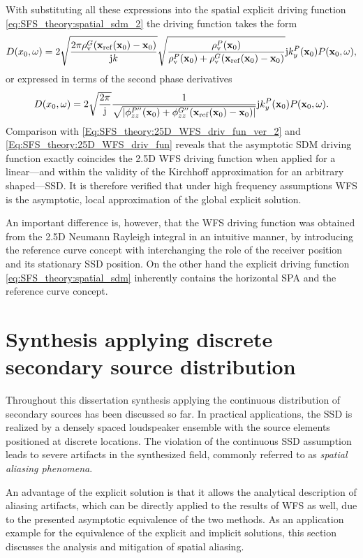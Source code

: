 With substituting all these expressions into the spatial explicit driving function \eqref{eq:SFS_theory:spatial_sdm_2} the driving function takes the form
\begin{equation}
D(x_0,\omega) =
2\sqrt{\frac{2\pi  \rho_\mathrm{v}^G(\mathbf{x}_{\mathrm{ref}}(\mathbf{x}_0)-\mathbf{x}_0)}{\mathrm{j} k}} 
\sqrt{\frac{\rho_\mathrm{v}^P(\mathbf{x}_0) }{\rho_\mathrm{v}^P(\mathbf{x}_0) + \rho_\mathrm{v}^G(\mathbf{x}_{\mathrm{ref}}(\mathbf{x}_0)-\mathbf{x}_0)}}
\mathrm{j} k_y^{P}(\mathbf{x}_0)
P(\mathbf{x}_0,\omega),
\end{equation}
or expressed in terms of the second phase derivatives 
\begin{equation}
D(x_0,\omega) =
2\sqrt{\frac{2\pi }{\mathrm{j} }} 
\frac{ 1 }{\sqrt{|\phi^{P''}_{zz}(\mathbf{x}_0) + \phi^{G''}_{zz}(\mathbf{x}_{\mathrm{ref}}(\mathbf{x}_0)-\mathbf{x}_0)|}}
\mathrm{j} k_y^{P}(\mathbf{x}_0)
P(\mathbf{x}_0,\omega).
\end{equation}
Comparison with \eqref{Eq:SFS_theory:25D_WFS_driv_fun_ver_2} and \eqref{Eq:SFS_theory:25D_WFS_driv_fun} reveals that the asymptotic SDM driving function exactly coincides the 2.5D WFS driving function when applied for a linear---and within the validity of the Kirchhoff approximation for an arbitrary shaped---SSD.
It is therefore verified that under high frequency assumptions WFS is the asymptotic, local approximation of the global explicit solution.

An important difference is, however, that the WFS driving function was obtained from the 2.5D Neumann Rayleigh integral in an intuitive manner, by introducing the reference curve concept with interchanging the role of the receiver position and its stationary SSD position. 
On the other hand the explicit driving function \eqref{eq:SFS_theory:spatial_sdm} inherently contains the horizontal SPA and the reference curve concept.

\section{Synthesis applying discrete secondary source distribution}
\label{Sec:Aliasing}

Throughout this dissertation synthesis applying the continuous distribution of secondary sources has been discussed so far.
In practical applications, the SSD is realized by a densely spaced loudspeaker ensemble with the source elements positioned at discrete locations.
The violation of the continuous SSD assumption leads to severe artifacts in the synthesized field, commonly referred to as \emph{spatial aliasing phenomena}.

An advantage of the explicit solution is that it allows the analytical description of aliasing artifacts, which can be directly applied to the results of WFS as well, due to the presented asymptotic equivalence of the two methods.
As an application example for the equivalence of the explicit and implicit solutions, this section discusses the analysis and mitigation of spatial aliasing.

